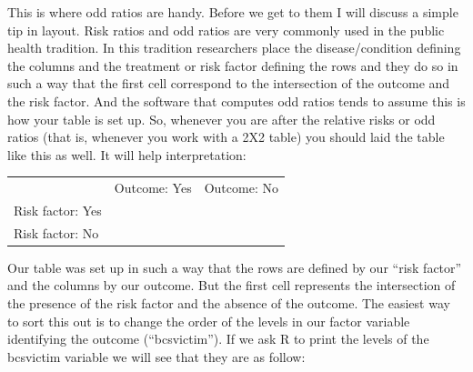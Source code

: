 \documentclass[]{book}
\theoremstyle{definition}
\theoremstyle{definition}
\theoremstyle{definition}
\theoremstyle{remark}
\begin{document}
This is where odd ratios are handy. Before we get to them I will discuss
a simple tip in layout. Risk ratios and odd ratios are very commonly
used in the public health tradition. In this tradition researchers place
the disease/condition defining the columns and the treatment or risk
factor defining the rows and they do so in such a way that the first
cell correspond to the intersection of the outcome and the risk factor.
And the software that computes odd ratios tends to assume this is how
your table is set up. So, whenever you are after the relative risks or
odd ratios (that is, whenever you work with a 2X2 table) you should laid
the table like this as well. It will help interpretation:

\begin{longtable}[]{@{}lll@{}}
\toprule
\endhead
\begin{minipage}[t]{0.25\columnwidth}\raggedright
\strut
\end{minipage} & \begin{minipage}[t]{0.28\columnwidth}\raggedright
Outcome: Yes\strut
\end{minipage} & \begin{minipage}[t]{0.23\columnwidth}\raggedright
Outcome: No\strut
\end{minipage}\tabularnewline
\begin{minipage}[t]{0.25\columnwidth}\raggedright
Risk factor: Yes\strut
\end{minipage} & \begin{minipage}[t]{0.28\columnwidth}\raggedright
\strut
\end{minipage} & \begin{minipage}[t]{0.23\columnwidth}\raggedright
\strut
\end{minipage}\tabularnewline
\begin{minipage}[t]{0.25\columnwidth}\raggedright
Risk factor: No\strut
\end{minipage} & \begin{minipage}[t]{0.28\columnwidth}\raggedright
\strut
\end{minipage} & \begin{minipage}[t]{0.23\columnwidth}\raggedright
\strut
\end{minipage}\tabularnewline
\bottomrule
\end{longtable}

Our table was set up in such a way that the rows are defined by our
``risk factor'' and the columns by our outcome. But the first cell
represents the intersection of the presence of the risk factor and the
absence of the outcome. The easiest way to sort this out is to change
the order of the levels in our factor variable identifying the outcome
(``bcsvictim''). If we ask R to print the levels of the bcsvictim
variable we will see that they are as follow:
\end{document}
